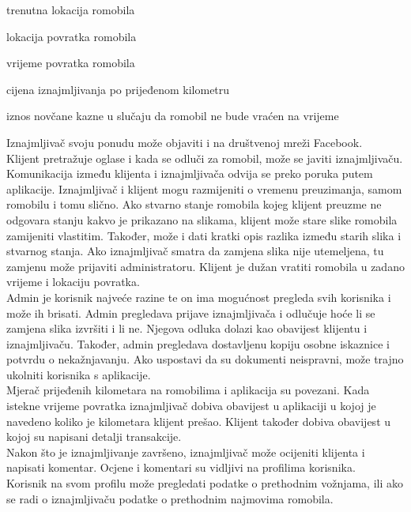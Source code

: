 		\begin{packed_item} 
			\item trenutna lokacija romobila
			\item lokacija povratka romobila
			\item vrijeme povratka romobila
			\item cijena iznajmljivanja po prijeđenom kilometru
			\item iznos novčane kazne u slučaju da romobil ne bude vraćen na vrijeme
		\end{packed_item}
		Iznajmljivač svoju ponudu može objaviti i na društvenoj mreži Facebook.\\
		\indent Klijent pretražuje oglase i kada se odluči za romobil, može se javiti iznajmljivaču. Komunikacija između klijenta i iznajmljivača odvija se preko poruka putem aplikacije. Iznajmljivač i klijent mogu razmijeniti o vremenu preuzimanja, samom romobilu i tomu slično. Ako stvarno stanje romobila kojeg klijent preuzme ne odgovara stanju kakvo je prikazano na slikama, klijent može stare slike romobila zamijeniti vlastitim. Također, može i dati kratki opis razlika između starih slika i stvarnog stanja. Ako iznajmljivač smatra da zamjena slika nije utemeljena, tu zamjenu može prijaviti administratoru. Klijent je dužan vratiti romobila u zadano vrijeme i lokaciju povratka.  \\
		\indent Admin je korisnik najveće razine te on ima mogućnost pregleda svih korisnika i može ih brisati. Admin pregledava prijave iznajmljivača i odlučuje hoće li se zamjena slika izvršiti i li ne. Njegova odluka dolazi kao obavijest klijentu i iznajmljivaču. Također, admin pregledava dostavljenu kopiju osobne iskaznice i potvrdu o nekažnjavanju. Ako uspostavi da su dokumenti neispravni, može trajno ukolniti korisnika s aplikacije.\\
		\indent Mjerač prijeđenih kilometara na romobilima i aplikacija su povezani. Kada istekne vrijeme povratka iznajmljivač dobiva obavijest u aplikaciji u kojoj je navedeno koliko je kilometara klijent prešao. Klijent također dobiva obavijest u kojoj su napisani detalji transakcije. \\
		\indent Nakon što je iznajmljivanje završeno, iznajmljivač može ocijeniti klijenta i napisati komentar. Ocjene i komentari su vidljivi na profilima korisnika. \\
		\indent Korisnik na svom profilu može pregledati podatke o prethodnim vožnjama, ili ako se radi o iznajmljivaču podatke o prethodnim najmovima romobila.\\ \\
		
